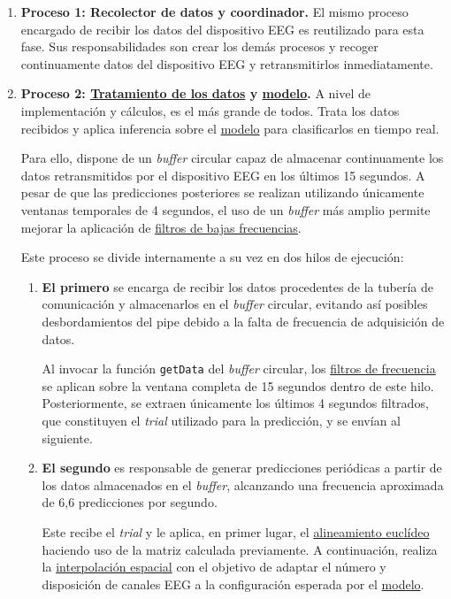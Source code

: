 \begin{itemize}
	\begin{enumerate}
		\item \textbf{Proceso 1: Recolector de datos y coordinador.} El mismo proceso encargado de recibir los datos del dispositivo EEG es reutilizado para esta fase. Sus responsabilidades son crear los demás procesos y recoger continuamente datos del dispositivo EEG y retransmitirlos inmediatamente.
		\item \textbf{Proceso 2: \hyperref[cap:tratamientoDatos]{Tratamiento de los datos} y \hyperref[sec:modelo]{modelo}.} A nivel de implementación y cálculos, es el más grande de todos. Trata los datos recibidos y aplica inferencia sobre el \hyperref[sec:modelo]{modelo} para clasificarlos en tiempo real.
		
		Para ello, dispone de un \textit{buffer} circular capaz de almacenar continuamente los datos retransmitidos por el dispositivo EEG en los últimos 15 segundos. A pesar de que las predicciones posteriores se realizan utilizando únicamente ventanas temporales de 4 segundos, el uso de un \textit{buffer} más amplio permite mejorar la aplicación de \hyperref[subsec:FiltradoFrecuencia]{filtros de bajas frecuencias}. 
		
		Este proceso se divide internamente a su vez en dos hilos de ejecución: 

		\begin{enumerate}
			\item \textbf{El primero} se encarga de recibir los datos procedentes de la tubería de comunicación y almacenarlos en el \textit{buffer} circular, evitando así posibles desbordamientos del pipe debido a la falta de frecuencia de adquisición de datos.
			
			Al invocar la función \texttt{getData} del \textit{buffer} circular, los \hyperref[subsec:FiltradoFrecuencia]{filtros de frecuencia} se aplican sobre la ventana completa de 15 segundos dentro de este hilo. Posteriormente, se extraen únicamente los últimos 4 segundos filtrados, que constituyen el \textit{trial} utilizado para la predicción, y se envían al siguiente.
 
			\item \textbf{El segundo} es responsable de generar predicciones periódicas a partir de los datos almacenados en el \textit{buffer}, alcanzando una frecuencia aproximada de 6,6 predicciones por segundo.
			
			Este recibe el \textit{trial} y le aplica, en primer lugar, el \hyperref[subsec:alineamiento_euclideo]{alineamiento euclídeo} haciendo uso de la matriz calculada previamente. A continuación, realiza la \hyperref[sec:interpolación_espacial]{interpolación espacial} con el objetivo de adaptar el número y disposición de canales EEG a la configuración esperada por el \hyperref[sec:modelo]{modelo}.


\end{enumerate}
\end{enumerate}
\end{itemize}
